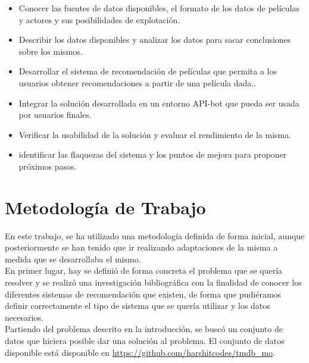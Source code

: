 \begin{itemize}
    \item Conocer las fuentes de datos disponibles, el formato de los datos de películas y actores y sus posibilidades de explotación.
    \item Describir los datos disponibles y analizar los datos para sacar conclusiones sobre los mismos.
    \item Desarrollar el sistema de recomendación de películas que permita a los usuarios obtener recomendaciones a partir de una película dada..
    \item Integrar la solución desarrollada en un entorno API-bot que pueda ser usada por usuarios finales.
    \item Verificar la usabilidad de la solución y evaluar el rendimiento de la misma.
    \item identificar las flaquezas del sistema y los puntos de mejora para proponer próximos pasos.
\end{itemize}

\section{Metodología de Trabajo}\label{sec:metodología}

En este trabajo, se ha utilizado una metodología definida de forma inicial, aunque posteriormente se han tenido que ir realizando adaptaciones de la misma a medida que se desarrollaba el mismo.\\

En primer lugar, hay se definió de forma concreta el problema que se quería resolver y se realizó una investigación bibliográfica con la finalidad de conocer los diferentes sistemas de recomendación que existen, de forma que pudiéramos definir correctamente el tipo de sistema que se quería utilizar y los datos necesarios.\\

Partiendo del problema descrito en la introducción, se buscó un conjunto de datos que hiciera posible dar una solución al problema. El conjunto de datos disponible está disponible en \url{https://github.com/harshitcodes/tmdb_mo}.\\

